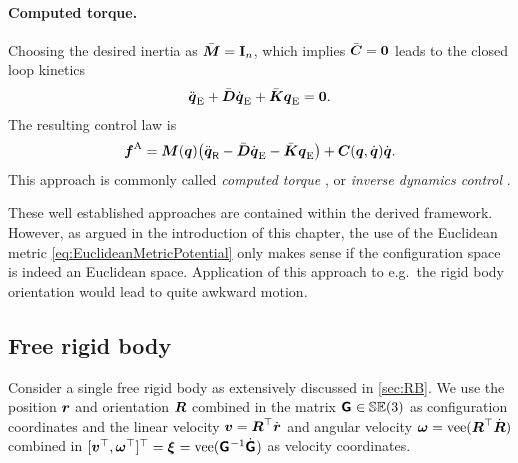 \paragraph{Computed torque.}
Choosing the desired inertia as $\sysInertiaMatC = \idMat[{\dimConfigSpace}]$, which implies $\ConnMatC = \mat{0}$ leads to the closed loop kinetics
\begin{align}
 \genCoordEdd + \sysDissMatC \genCoordEd + \sysStiffMatC \genCoordE = \tuple{0}.
\end{align}
The resulting control law is
\begin{align}
 \genForceImpressed = \sysInertiaMat(\genCoord) \big( \genCoordRdd - \sysDissMatC \genCoordEd - \sysStiffMatC \genCoordE \big) + \ConnMat(\genCoord, \genCoordd) \genCoordd.
\end{align}
This approach is commonly called \textit{computed torque} \cite[sec.\,4.5.2]{Murray:Robotic}, \cite[sec.\,9.1.2]{Slotine:AppliedNonlinearControl} or \textit{inverse dynamics control} \cite[sec.\,8.3]{Spong:RobotModelingAndControl}.

These well established approaches are contained within the derived framework.
However, as argued in the introduction of this chapter, the use of the Euclidean metric \eqref{eq:EuclideanMetricPotential} only makes sense if the configuration space is indeed an Euclidean space.
Application of this approach to e.g.\ the rigid body orientation would lead to quite awkward motion.


\subsection{Free rigid body}\label{sec:CtrlApproachEnergySingleBody}
Consider a single free rigid body as extensively discussed in \autoref{sec:RB}.
We use the position $\r$ and orientation $\R$ combined in the matrix $\bodyHomoCoord{}{} \in \SpecialEuclideanGroup(3)$ as configuration coordinates and the linear velocity $\v = \R^\top \rd$ and angular velocity $\w = \veeOp(\R^\top \Rd)$ combined in $[\v^\top, \w^\top]^\top = \bodyVel{}{} = \veeOp(\bodyHomoCoord{}{}^{-1} \bodyHomoCoordd{}{})$ as velocity coordinates.


